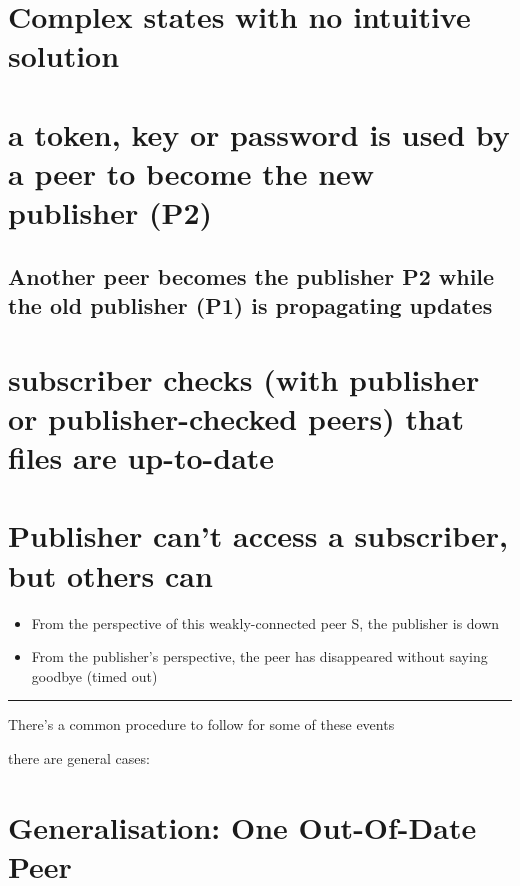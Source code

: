 \documentclass[12pt,a4paper,]{adreport}
\begin{document}
\section{Complex states with no intuitive
solution}\label{complex-states-with-no-intuitive-solution}

\section{a token, key or password is used by a peer to become the new
publisher
(P2)}\label{a-token-key-or-password-is-used-by-a-peer-to-become-the-new-publisher-p2}

\subsection{Another peer becomes the publisher P2 while the old
publisher (P1) is propagating
updates}\label{another-peer-becomes-the-publisher-p2-while-the-old-publisher-p1-is-propagating-updates}

\section{subscriber checks (with publisher or publisher-checked peers)
that files are
up-to-date}\label{subscriber-checks-with-publisher-or-publisher-checked-peers-that-files-are-up-to-date}

\section{Publisher can't access a subscriber, but others
can}\label{publisher-cant-access-a-subscriber-but-others-can}

\begin{itemize}
\itemsep1pt\parskip0pt
\item
  From the perspective of this weakly-connected peer S, the publisher is
  down
\item
  From the publisher's perspective, the peer has disappeared without
  saying goodbye (timed out)
\end{itemize}

\begin{center}\rule{3in}{0.4pt}\end{center}

There's a common procedure to follow for some of these events

there are general cases:

\section{Generalisation: One Out-Of-Date
Peer}\label{generalisation-one-out-of-date-peer}
\end{document}
